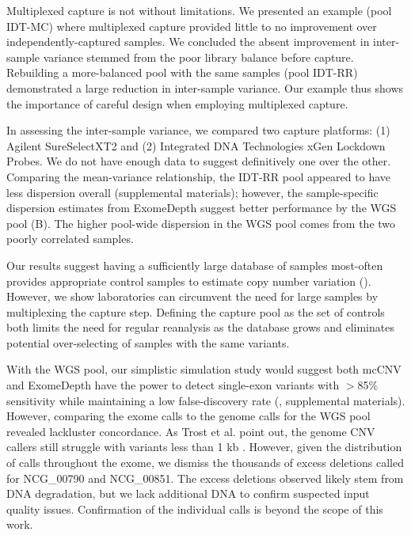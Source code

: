 \documentclass{bmcart}\usepackage[]{graphicx}\usepackage[]{color}
\begin{document}
Multiplexed capture is not without limitations.
We presented an example (pool IDT-MC) where multiplexed capture provided little to no improvement over independently-captured samples.
We concluded the absent improvement in inter-sample variance stemmed from the poor library balance before capture.
Rebuilding a more-balanced pool with the same samples (pool IDT-RR) demonstrated a large reduction in inter-sample variance.
Our example thus shows the importance of careful design when employing multiplexed capture.

In assessing the inter-sample variance, we compared two capture platforms: (1) Agilent SureSelectXT2 and (2) Integrated DNA Technologies xGen Lockdown Probes.
We do not have enough data to suggest definitively one over the other.
Comparing the mean-variance relationship, the IDT-RR pool appeared to have less dispersion overall (supplemental materials); however, the sample-specific dispersion estimates from ExomeDepth suggest better performance by the WGS pool (B).
The higher pool-wide dispersion in the WGS pool comes from the two poorly correlated samples.

Our results suggest having a sufficiently large database of samples most-often provides appropriate control samples to estimate copy number variation ().
However, we show laboratories can circumvent the need for large samples by multiplexing the capture step.
Defining the capture pool as the set of controls both limits the need for regular reanalysis as the database grows and eliminates potential over-selecting of samples with the same variants.

With  the WGS pool, our simplistic simulation study would suggest both mcCNV and ExomeDepth have the power to detect single-exon variants with $>$85\% sensitivity while maintaining a low false-discovery rate (, supplemental materials).
However, comparing the exome calls to the genome calls for the WGS pool revealed lackluster concordance.
As Trost et al. point out, the genome CNV callers still struggle with variants less than 1 kb \cite{trost:2018aa}.
However, given the distribution of calls throughout the exome, we dismiss the thousands of excess deletions called for NCG\_00790 and NCG\_00851.
The excess deletions observed likely stem from DNA degradation, but we lack additional DNA to confirm suspected input quality issues.
Confirmation of the individual calls is beyond the scope of this work.
\end{document}
